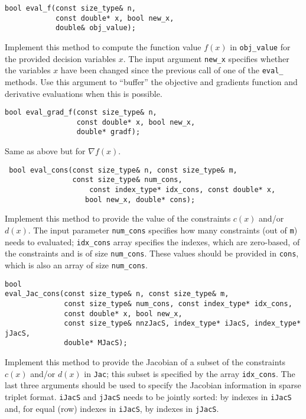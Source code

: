 \begin{lstlisting} 
bool eval_f(const size_type& n, 
            const double* x, bool new_x, 
            double& obj_value);
\end{lstlisting} 

\noindent Implement this method to compute the function value $f(x)$ in \texttt{obj\_value} for the provided decision variables $x$. The input argument \texttt{new\_x} specifies whether the variables $x$ have been changed since the previous call of one of the \texttt{eval\_} methods. Use this argument to ``buffer'' the objective and gradients function and derivative evaluations when this is possible.

\begin{lstlisting} 
bool eval_grad_f(const size_type& n, 
                 const double* x, bool new_x, 
                 double* gradf);
\end{lstlisting} 

\noindent Same as above but for $\nabla f(x)$.

\begin{lstlisting} 
 bool eval_cons(const size_type& n, const size_type& m, 
                const size_type& num_cons,
				    const index_type* idx_cons, const double* x, 
			       bool new_x, double* cons);
\end{lstlisting} 

\noindent Implement this method to provide the value of the constraints $c(x)$ and/or $d(x)$. The input parameter \texttt{num\_cons} specifies how many constraints (out of \texttt{m}) needs to evaluated; \texttt{idx\_cons} array specifies the indexes, which are zero-based, of the constraints  and is of size \texttt{num\_cons}. These values should be provided in \texttt{cons}, which is also an array of size \texttt{num\_cons}.



\begin{lstlisting} 
bool 
eval_Jac_cons(const size_type& n, const size_type& m, 
              const size_type& num_cons, const index_type* idx_cons,  
              const double* x, bool new_x,
              const size_type& nnzJacS, index_type* iJacS, index_type* jJacS,
              double* MJacS);
\end{lstlisting} 

\noindent Implement this method to provide the Jacobian of a subset of the  constraints $c(x)$ and/or $d(x)$ in \texttt{Jac}; this subset is specified by the array \texttt{idx\_cons}. The last three arguments should be used to specify the Jacobian information in sparse triplet format.  \texttt{iJacS} and \texttt{jJacS} needs to be jointly sorted: by indexes in \texttt{iJacS} and, for equal (row) indexes in \texttt{iJacS}, by indexes in \texttt{jJacS}.

